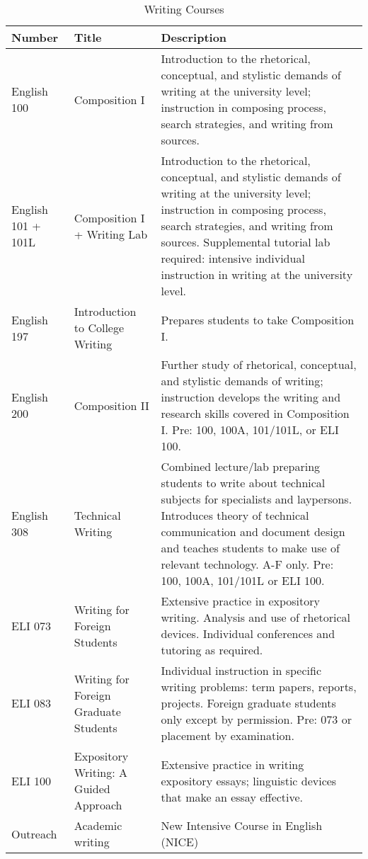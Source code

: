 \documentclass[
]{book}
\begin{document}
\begin{table}

\caption{\label{tab:unnamed-chunk-2}Writing Courses}
\centering
\begin{tabular}[t]{lll}
\toprule
Number & Title & Description\\
\midrule
English 100 & Composition I & Introduction to the rhetorical, conceptual, and stylistic demands of writing at the university level; instruction in composing process, search strategies, and writing from sources.\\
English 101 + 101L & Composition I + Writing Lab & Introduction to the rhetorical, conceptual, and stylistic demands of writing at the university level; instruction in composing process, search strategies, and writing from sources. Supplemental tutorial lab required: intensive individual instruction in writing at the university level.\\
English 197 & Introduction to College Writing & Prepares students to take Composition I.\\
English 200 & Composition II & Further study of rhetorical, conceptual, and stylistic demands of writing; instruction develops the writing and research skills covered in Composition I. Pre: 100, 100A, 101/101L, or ELI 100.\\
English 308 & Technical Writing & Combined lecture/lab preparing students to write about technical subjects for specialists and laypersons. Introduces theory of technical communication and document design and teaches students to make use of relevant technology. A-F only. Pre: 100, 100A, 101/101L or ELI 100.\\
\addlinespace
ELI 073 & Writing for Foreign Students & Extensive practice in expository writing. Analysis and use of rhetorical devices. Individual conferences and tutoring as required.\\
ELI 083 & Writing for Foreign Graduate Students & Individual instruction in specific writing problems: term papers, reports, projects. Foreign graduate students only except by permission. Pre: 073 or placement by examination.\\
ELI 100 & Expository Writing: A Guided Approach & Extensive practice in writing expository essays; linguistic devices that make an essay effective.\\
Outreach & Academic writing & New Intensive Course in English (NICE)\\
\bottomrule
\end{tabular}
\end{table}
\end{document}
